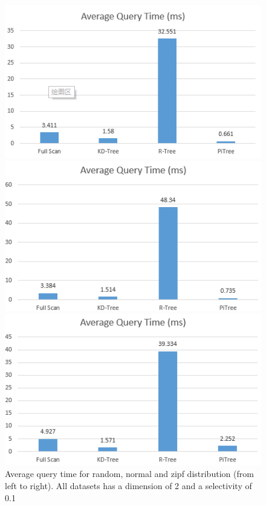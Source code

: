 \documentclass[sigconf,10pt]{acmart}
\begin{document}
\begin{figure}[t] 
  \label{overall-performance-qtime} 
  \begin{minipage}[b]{0.33\linewidth}
    \centering
    \includegraphics[width=.8\linewidth]{../figures/overall-performance/random-qtime} 
    \vspace{4ex}
  \end{minipage}%
  \begin{minipage}[b]{0.33\linewidth}
    \centering
    \includegraphics[width=.8\linewidth]{../figures/overall-performance/normal-qtime} 
    \vspace{4ex}
  \end{minipage}%
  \begin{minipage}[b]{0.33\linewidth}
    \centering
    \includegraphics[width=.8\linewidth]{../figures/overall-performance/zipf-qtime} 
    \vspace{4ex}
  \end{minipage}
  \caption{Average query time for random, normal and zipf distribution (from left to right). 
  All datasets has a dimension of 2 and a selectivity of 0.1}
\end{figure}
\end{document}
